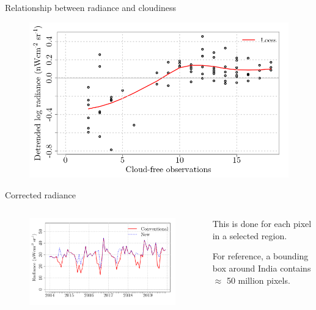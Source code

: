 \documentclass[aspectratio=169]{beamer} %
\begin{document}
        \begin{frame}{Relationship between radiance and cloudiness}
          \begin{figure}
            \includegraphics[width=0.8\linewidth]{loess.png}
          \end{figure}
        \end{frame}


        \begin{frame}{Corrected radiance}
          \begin{columns}
            \begin{column}{0.6\textwidth}
              \begin{minipage}[c][0.7\textheight][c]{\linewidth}
                \begin{figure}
                  \includegraphics[width=\linewidth]{biasCorrected.png}
                \end{figure}
              \end{minipage}
            \end{column}
            \begin{column}{0.4\textwidth}
              \begin{minipage}[c][0.6\textheight][c]{\linewidth}
                This is done for each pixel in a selected region.
                
                For reference, a bounding box around India contains $\approx$ 50 million pixels. 
                 \\ 
              \end{minipage}
            \end{column}
          \end{columns}
        \end{frame}
\end{document}
